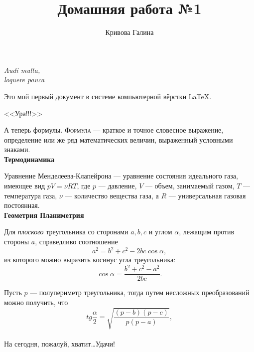 \documentclass{article}
\title{Домашняя работа №1}
\author{Кривова Галина}
\date{}
\begin{document}
\maketitle

\begin{flushright}
\textit{Audi multa,\\loquere pauca}
\end{flushright}

\vspace{20 pt}Это мой первый документ в системе компьютерной вёрстки \LaTeX .

\begin{center}
\huge{\textsf{<<Ура!!!>>}}
\end{center}

А теперь формулы. \textsc{Формула} --- краткое и точное словесное выражение, определение или же ряд математических величин, выраженный условными знаками.\vspace{15 pt}\\\hspace*{28 pt}\large{\textbf{Термодинамика}}

Уравнение Менделеева-Клапейрона --- уравнение состояния идеального газа, имеющее вид $pV=\nu RT$, где $p$ --- давление, $V$ --- объем, занимаемый газом, $T$ --- температура газа, $\nu$ --- количество вещества газа, а $R$ --- универсальная газовая постоянная.%
\vspace{15 pt}\\\hspace*{28 pt}%
\large{\textbf{Геометрия \hfill Планиметрия}}

Для {\itshape плоского} треугольника со сторонами $a,b,c$ и углом $\alpha$, лежащим против стороны $a$, справедливо соотношение 
$$
a^2=b^2 + c^2 - 2bc \cos \alpha,
$$
из которого можно выразить косинус угла треугольника:
$$
\cos \alpha = \frac{b^2 + c^2 - a^2}{2bc}.
$$

Пусть $p$ --- полупериметр треугольника, тогда путем несложных преобразований можно получить, что
$$
tg{ \frac{\alpha}{2}} = \sqrt{ \frac{(p-b)(p-c)}{p(p-a)}},
$$%
\vspace*{1 cm}\\На сегодня, пожалуй, хватит\dots Удачи!
\end{document}

